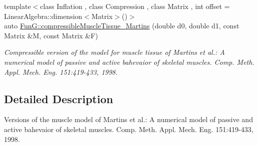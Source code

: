 \begin{DoxyCompactItemize}
{\footnotesize template$<$class Inflation , class Compression , class Matrix , int offset = Linear\-Algebra\-::dimension$<$\-Matrix$>$()$>$ }\\auto \hyperlink{group__Biomechanics_ga46a70ccb2285e12addad87b6a8aaaae8}{Fun\-G\-::compressible\-Muscle\-Tissue\-\_\-\-Martins} (double d0, double d1, const Matrix \&M, const Matrix \&F)
\begin{DoxyCompactList}\small\item\em Compressible version of the model for muscle tissue of Martins et al.\-: A numerical model of passive and active bahevaior of skeletal muscles. Comp. Meth. Appl. Mech. Eng. 151\-:419-\/433, 1998. \end{DoxyCompactList}\end{DoxyCompactItemize}


\subsection{Detailed Description}
Versions of the muscle model of Martins et al.\-: A numerical model of passive and active bahevaior of skeletal muscles. Comp. Meth. Appl. Mech. Eng. 151\-:419-\/433, 1998. 